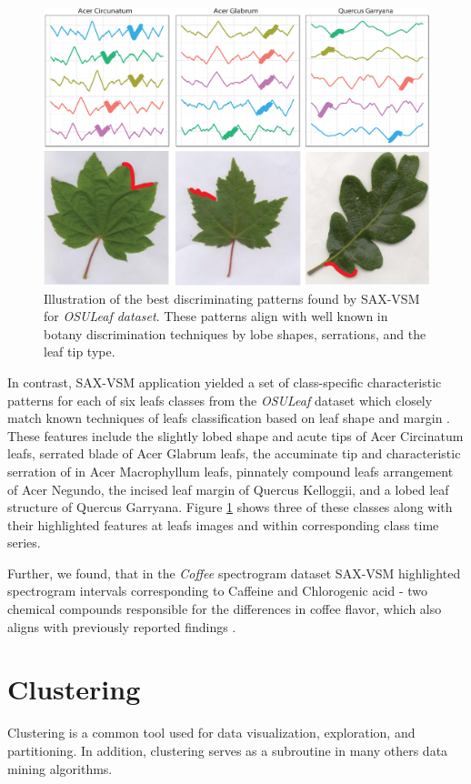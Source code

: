 \documentclass{llncs}
\begin{document}
\begin{figure}[t]
   \centering
   \includegraphics[width=115mm]{figures/AcerCircunatum.eps}
   \caption{Illustration of the best discriminating patterns found by SAX-VSM for
\textit{OSULeaf dataset}. These patterns align with well known in botany discrimination techniques
by lobe shapes, serrations, and the leaf tip type.}
   \label{fig:shapelet-acer-patterns}
\end{figure}

In contrast, SAX-VSM application yielded a set of class-specific characteristic patterns for each of
six leafs classes from the \textit{OSULeaf} dataset which closely match known techniques of leafs
classification based on leaf shape and margin \cite{dirr}. These features include the slightly
lobed shape and acute tips of Acer Circinatum leafs, serrated blade of Acer Glabrum leafs,
the accuminate tip and characteristic serration of in Acer Macrophyllum leafs, pinnately compound
leafs arrangement of Acer Negundo, the incised leaf margin of Quercus Kelloggii, and a lobed leaf
structure of Quercus Garryana. Figure \ref{fig:shapelet-acer-patterns} shows three of these classes
along with their highlighted features at leafs images and within corresponding class time series.

Further, we found, that in the \textit{Coffee} spectrogram dataset SAX-VSM highlighted spectrogram
intervals corresponding to Caffeine and Chlorogenic acid - two chemical compounds responsible for
the differences in coffee flavor, which also aligns with previously reported findings \cite{coffee}.


\section{Clustering}
Clustering is a common tool used for data visualization, exploration, and partitioning. 
In addition, clustering serves as a subroutine in many others data mining algorithms.
\end{document}
